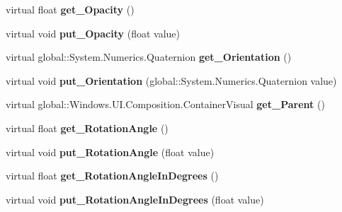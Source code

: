 \begin{DoxyCompactItemize}
virtual float {\bfseries get\+\_\+\+Opacity} ()
\item 
\mbox{\label{class_windows_1_1_u_i_1_1_composition_1_1_visual_ac9c346d6488aba1731166730bd1abb6c}} 
virtual void {\bfseries put\+\_\+\+Opacity} (float value)
\item 
\mbox{\label{class_windows_1_1_u_i_1_1_composition_1_1_visual_a3cd98e040ae25a3b0e41adff6ce17cde}} 
virtual global\+::\+System.\+Numerics.\+Quaternion {\bfseries get\+\_\+\+Orientation} ()
\item 
\mbox{\label{class_windows_1_1_u_i_1_1_composition_1_1_visual_ab875fd373be5e98cf555fe044dfb879b}} 
virtual void {\bfseries put\+\_\+\+Orientation} (global\+::\+System.\+Numerics.\+Quaternion value)
\item 
\mbox{\label{class_windows_1_1_u_i_1_1_composition_1_1_visual_a26c62464881951a01cbced9fe2d055cf}} 
virtual global\+::\+Windows.\+U\+I.\+Composition.\+Container\+Visual {\bfseries get\+\_\+\+Parent} ()
\item 
\mbox{\label{class_windows_1_1_u_i_1_1_composition_1_1_visual_a46a0e2c6f7487264a8eb1652dd8716e6}} 
virtual float {\bfseries get\+\_\+\+Rotation\+Angle} ()
\item 
\mbox{\label{class_windows_1_1_u_i_1_1_composition_1_1_visual_a912ec0e9a447786e1502e1290aeb7f59}} 
virtual void {\bfseries put\+\_\+\+Rotation\+Angle} (float value)
\item 
\mbox{\label{class_windows_1_1_u_i_1_1_composition_1_1_visual_a6afa235bbf0eda06c026297cadc1b005}} 
virtual float {\bfseries get\+\_\+\+Rotation\+Angle\+In\+Degrees} ()
\item 
\mbox{\label{class_windows_1_1_u_i_1_1_composition_1_1_visual_ab913ab76eea8338f04b946c0fa8e8df1}} 
virtual void {\bfseries put\+\_\+\+Rotation\+Angle\+In\+Degrees} (float value)

\end{DoxyCompactItemize}
